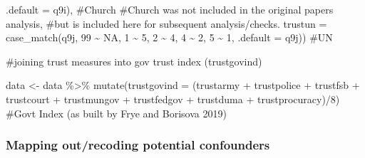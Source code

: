 \documentclass[
  letterpaper,
  DIV=11,
  numbers=noendperiod]{scrartcl}
\newenvironment{Shaded}{\begin{snugshade}}{\end{snugshade}}
\newcommand{\AttributeTok}[1]{\textcolor[rgb]{0.40,0.45,0.13}{#1}}
\newcommand{\CommentTok}[1]{\textcolor[rgb]{0.37,0.37,0.37}{#1}}
\newcommand{\ConstantTok}[1]{\textcolor[rgb]{0.56,0.35,0.01}{#1}}
\newcommand{\DecValTok}[1]{\textcolor[rgb]{0.68,0.00,0.00}{#1}}
\newcommand{\FunctionTok}[1]{\textcolor[rgb]{0.28,0.35,0.67}{#1}}
\newcommand{\NormalTok}[1]{\textcolor[rgb]{0.00,0.23,0.31}{#1}}
\newcommand{\OtherTok}[1]{\textcolor[rgb]{0.00,0.23,0.31}{#1}}
\newcommand{\SpecialCharTok}[1]{\textcolor[rgb]{0.37,0.37,0.37}{#1}}
\begin{document}
\begin{Shaded}
\begin{Highlighting}[]
                                  \AttributeTok{.default =}\NormalTok{ q9i), }\CommentTok{\#Church}
         \CommentTok{\#Church was not included in the original paper\textquotesingle{}s analysis, }
         \CommentTok{\#but is included here for subsequent analysis/checks.}
         \AttributeTok{trustun =} \FunctionTok{case\_match}\NormalTok{(q9j, }\DecValTok{99} \SpecialCharTok{\textasciitilde{}} \ConstantTok{NA}\NormalTok{, }\DecValTok{1} \SpecialCharTok{\textasciitilde{}} \DecValTok{5}\NormalTok{, }\DecValTok{2} \SpecialCharTok{\textasciitilde{}} \DecValTok{4}\NormalTok{, }\DecValTok{4} \SpecialCharTok{\textasciitilde{}} \DecValTok{2}\NormalTok{, }\DecValTok{5} \SpecialCharTok{\textasciitilde{}} \DecValTok{1}\NormalTok{, }
                              \AttributeTok{.default =}\NormalTok{ q9j)) }\CommentTok{\#UN}

\CommentTok{\#joining trust measures into gov trust index (trustgovind)}

\NormalTok{data }\OtherTok{\textless{}{-}}\NormalTok{ data }\SpecialCharTok{\%\textgreater{}\%} 
  \FunctionTok{mutate}\NormalTok{(}\AttributeTok{trustgovind =}\NormalTok{ (trustarmy }\SpecialCharTok{+}\NormalTok{ trustpolice }\SpecialCharTok{+}\NormalTok{ trustfsb }\SpecialCharTok{+}\NormalTok{ trustcourt }\SpecialCharTok{+} 
\NormalTok{                          trustmungov }\SpecialCharTok{+}\NormalTok{ trustfedgov }\SpecialCharTok{+}\NormalTok{ trustduma }\SpecialCharTok{+}
\NormalTok{                          trustprocuracy)}\SpecialCharTok{/}\DecValTok{8}\NormalTok{)}
\CommentTok{\#Gov\textquotesingle{}t Index (as built by Frye and Borisova 2019)}
\end{Highlighting}
\end{Shaded}

\subsubsection{Mapping out/recoding potential
confounders}\label{mapping-outrecoding-potential-confounders}
\end{document}
